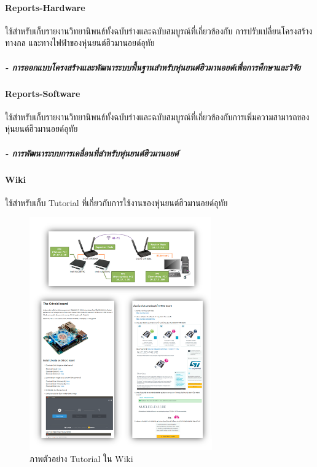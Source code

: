 \paragraph*{Reports-Hardware}
ใช้สำหรับเก็บรายงานวิทยานิพนธ์ทั้งฉบับร่างและฉบับสมบูรณ์ที่เกี่ยวข้องกับ การปรับเปลี่ยนโครงสร้างทางกล และทางไฟฟ้าของหุ่นยนต์ฮิวมานอยด์อุทัย
\subparagraph*{- การออกแบบโครงสร้างและพัฒนาระบบพื้นฐานสำหรับหุ่นยนต์ฮิวมานอยด์เพื่อการศึกษาและวิจัย}

\paragraph*{Reports-Software}
ใช้สำหรับเก็บรายงานวิทยานิพนธ์ทั้งฉบับร่างและฉบับสมบูรณ์ที่เกี่ยวข้องกับการเพิ่มความสามารถของหุ่นยนต์ฮิวมานอยด์อุทัย
\subparagraph*{- การพัฒนาระบบการเคลื่อนที่สำหรับหุ่นยนต์ฮิวมานอยด์}

\paragraph*{Wiki}
ใช้สำหรับเก็บ Tutorial ที่เกี่ยวกับการใช้งานของหุ่นยนต์ฮิวมานอยด์อุทัย

\begin{figure}[!ht]
	\centering
	\includegraphics[width=0.7\textwidth]{chapter4/images/uthai_platform/uthai_doc.png}
	\caption{ภาพตัวอย่าง Tutorial ใน Wiki}
	\label{fig:uthai_platform_uthai_doc}
\end{figure}

